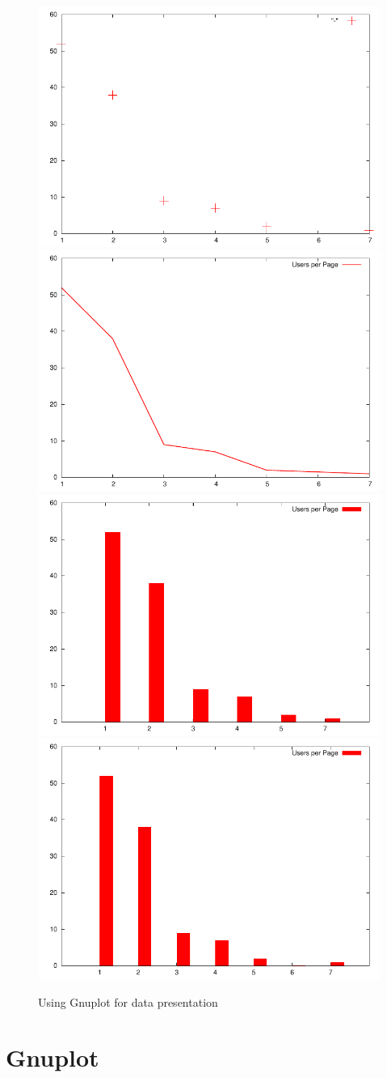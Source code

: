 \documentclass[a4paper]{scrartcl}
\begin{document}
\clearpage

\begin{figure}
  \includegraphics[width=.49\textwidth]{gp_hist_points}\hfill
  \includegraphics[width=.49\textwidth]{gp_hist_line}\\
  \includegraphics[width=.49\textwidth]{gp_hist_hist0}\hfill
  \includegraphics[width=.49\textwidth]{gp_hist_hist}
  \caption{Using Gnuplot for data presentation}
  \label{fig:gp_hist}
\end{figure}

\section{Gnuplot}
\label{sec:gnuplot}
\end{document}
